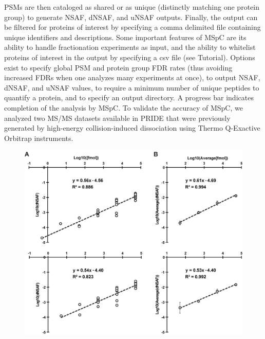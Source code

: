 PSMs are then cataloged as shared or as unique (distinctly matching one protein group) to generate NSAF, dNSAF, and uNSAF outputs.
Finally, the output can be filtered for proteins of interest by specifying a comma delimited file containing unique identifiers and descriptions.
Some important features of MSpC are its ability to handle fractionation experiments as input, and the ability to whitelist proteins of interest in the output by specifying a csv file (see Tutorial).
Options exist to specify global PSM and protein group FDR rates (thus avoiding increased FDRs when one analyzes many experiments at once), to output NSAF, dNSAF, and uNSAF values, to require a minimum number of unique peptides to quantify a protein, and to specify an output directory.
A progress bar indicates completion of the analysis by MSpC.
To validate the accuracy of MSpC, we analyzed two MS/MS datasets available in PRIDE that were previously generated by high-energy collision-induced dissociation using Thermo Q-Exactive Orbitrap instruments.
\begin{figure}[p]
	\centering
	\includegraphics[width=\columnwidth]{MSpC/figure1.png}
	\label{fig:UPS2}
\end{figure}

